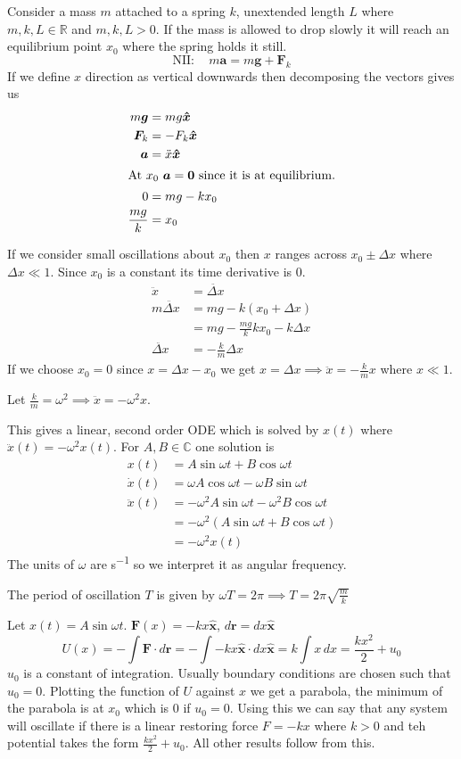 \documentclass{article}
\newcommand{\vh}[1]{\vec{\hat{#1}}}
\renewcommand{\vec}[1]{\bm{#1}}
\newcommand{\vv}[1]{\vec{#1}}
\newcommand{\bb}[1]{\mathbb{#1}}
\begin{document}
Consider a mass \(m\) attached to a spring \(k\), unextended length \(L\) where \(m,k,L\in\bb R\) and \(m,k,L>0\). If the mass is allowed to drop slowly it will reach an equilibrium point \(x_0\) where the spring holds it still.
\[\text{NII}:\quad m\vv a=m\vv g+\vv F_k\]
If we define \(x\) direction as vertical downwards then decomposing the vectors gives us
\begin{align*}
m\vv g&=mg\vh x\\
\vv F_k&=-F_k\vh x\\
\vv a&=\ddot x\vh x\\
\intertext{At \(x_0\) \(\vv a=\vv 0\) since it is at equilibrium.}
0&=mg-kx_0\\
\frac{mg}{k}&=x_0\\
\end{align*}

If we consider small oscillations about \(x_0\)  then \(x\) ranges across \(x_0\pm\Delta x\) where \(\Delta x\ll 1\). Since \(x_0\) is a constant its time derivative is 0.
\begin{align*}
\ddot x&=\ddot{\Delta x}\\
m\ddot{\Delta x}&=mg-k(x_0+\Delta x)\\
&=mg-\frac{mg}{k}kx_0-k\Delta x\\
\ddot{\Delta x}&=-\frac{k}{m}\Delta x
\end{align*}
If we choose \(x_0=0\) since \(x=\Delta x- x_0\) we get \(x=\Delta x\implies \ddot x=-\frac{k}{m}x\) where \(x\ll 1\).

Let \(\frac{k}{m}=\omega^2\implies \ddot x=-\omega^2 x\).

This gives a linear, second order ODE which is solved by \(x(t)\) where \(\ddot x(t)=-\omega^2 x(t)\). For \(A,B\in\bb C\) one solution is
\begin{align*}
x(t)&=A\sin\omega t+B\cos\omega t\\
\dot x(t)&=\omega A\cos\omega t-\omega B\sin\omega t\\
\ddot x(t)&=-\omega^2A\sin\omega t-\omega^2B\cos\omega t\\
&=-\omega^2(A\sin\omega t+B\cos\omega t)\\
&=-\omega^2x(t)
\end{align*}
The units of \(\omega\) are \si{s^{-1}} so we interpret it as angular frequency.

The period of oscillation \(T\) is given by \(\omega T=2\pi\implies T=2\pi\sqrt{\frac{m}{k}}\)

Let \(x(t)=A\sin\omega t\). \(\vv F(x)=-kx\vh x\), \(d\vv r=dx\vh x\)
\[U(x)=-\int\vv F\cdot d\vv r=-\int -kx\vh x\cdot dx\vh x=k\int x\,dx=\frac{kx^2}{2}+u_0\]
\(u_0\) is a constant of integration. Usually boundary conditions are chosen such that \(u_0=0\). Plotting the function of \(U\) against \(x\) we get a parabola, the minimum of the parabola is at \(x_0\) which is 0 if \(u_0=0\). Using this we can say that any system will oscillate if there is a linear restoring force \(F=-kx\) where \(k>0\) and teh potential takes the form \(\frac{kx^2}{2}+u_0\). All other results follow from this.
\end{document}
